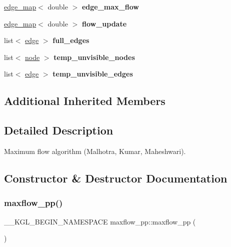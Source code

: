 \begin{DoxyCompactItemize}
\mbox{\label{classmaxflow__pp_a25d5bb2ab6c775a634dacf408ff55a83}} 
\mbox{\hyperlink{classedge__map}{edge\+\_\+map}}$<$ double $>$ {\bfseries edge\+\_\+max\+\_\+flow}
\item 
\mbox{\label{classmaxflow__pp_ad37aff831935b2cfd4b03bc4a6da06ce}} 
\mbox{\hyperlink{classedge__map}{edge\+\_\+map}}$<$ double $>$ {\bfseries flow\+\_\+update}
\item 
\mbox{\label{classmaxflow__pp_a55e32031f4f54b5cc934bc0307feca42}} 
list$<$ \mbox{\hyperlink{classedge}{edge}} $>$ {\bfseries full\+\_\+edges}
\item 
\mbox{\label{classmaxflow__pp_adf78e195b91cca1948074d77d535a9a9}} 
list$<$ \mbox{\hyperlink{classnode}{node}} $>$ {\bfseries temp\+\_\+unvisible\+\_\+nodes}
\item 
\mbox{\label{classmaxflow__pp_a5a0ede769352a2f29a261c4ce169cb02}} 
list$<$ \mbox{\hyperlink{classedge}{edge}} $>$ {\bfseries temp\+\_\+unvisible\+\_\+edges}
\end{DoxyCompactItemize}
\subsection*{Additional Inherited Members}


\subsection{Detailed Description}
Maximum flow algorithm (Malhotra, Kumar, Maheshwari). 

\subsection{Constructor \& Destructor Documentation}
\mbox{\label{classmaxflow__pp_a29ec393f72f3289c49a79b0da17e3ccd}} 
\subsubsection{\texorpdfstring{maxflow\+\_\+pp()}{maxflow\_pp()}}
{\footnotesize\ttfamily \+\_\+\+\_\+\+K\+G\+L\+\_\+\+B\+E\+G\+I\+N\+\_\+\+N\+A\+M\+E\+S\+P\+A\+CE maxflow\+\_\+pp\+::maxflow\+\_\+pp (\begin{DoxyParamCaption}{ }\end{DoxyParamCaption})}

